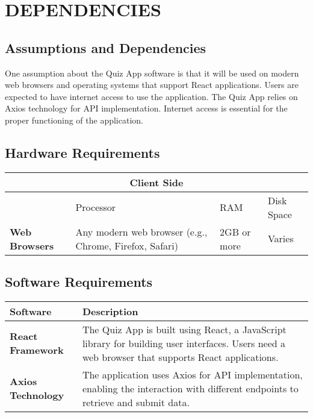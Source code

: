 \chapter{DEPENDENCIES}

\section{Assumptions and Dependencies}

One assumption about the Quiz App software is that it will be used on modern web browsers and operating systems that support React applications. Users are expected to have internet access to use the application. The Quiz App relies on Axios technology for API implementation. Internet access is essential for the proper functioning of the application.

\section{Hardware Requirements}

\begin{center}
\begin{tabular}{|p{3cm}|p{3cm}|p{3cm}|p{3cm}|}
    \hline
    \multicolumn{4}{|c|}{\textbf{Client Side}} \\
    \hline
    & Processor & RAM & Disk Space \\
    \hline 
    \textbf{Web Browsers} & Any modern web browser (e.g., Chrome, Firefox, Safari) & 2GB or more & Varies \\
    \hline
\end{tabular}
\end{center}

\section{Software Requirements}

\begin{center}
\begin{tabular}{|p{5cm}|p{10cm}|}
    \hline
    \textbf{Software} & \textbf{Description} \\
    \hline 
    \textbf{React Framework} & The Quiz App is built using React, a JavaScript library for building user interfaces. Users need a web browser that supports React applications. \\
    \hline
    \textbf{Axios Technology} & The application uses Axios for API implementation, enabling the interaction with different endpoints to retrieve and submit data. \\
    \hline
\end{tabular}
\end{center}
